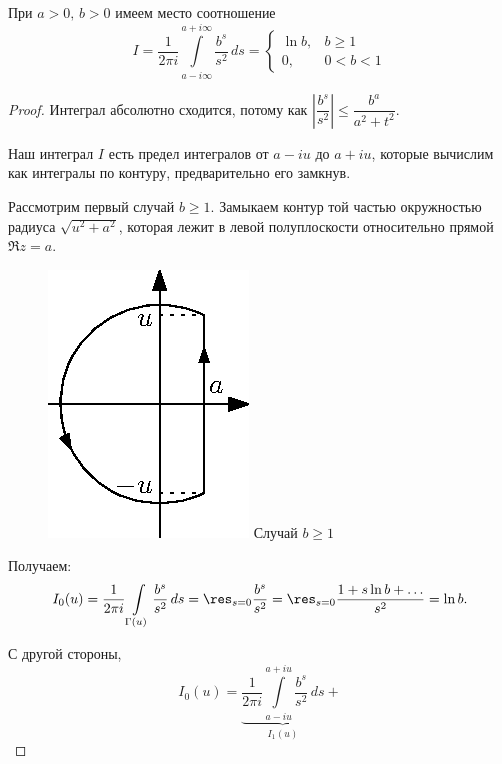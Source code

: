 \begin{lemma} При $a>0,\,b>0$ имеем место соотношение
$$I = \frac{1}{2\pi i}\int\limits_{a - i\infty}^{a + i\infty} \frac{b^s}{s^2}\,ds =
\begin{cases}
\ln b,&b \geqslant 1\\
0,&0<b<1
\end{cases}$$
\label{lemma_for_om_formula}
\end{lemma}
\begin{proof}
Интеграл абсолютно сходится, потому как  $\left|\dfrac{b^s}{s^2}\right| \leqslant \dfrac{b^a}{a^2 + t^2}$.


Наш интеграл $I$ есть предел интегралов от $a-iu$ до $a+iu$, которые вычислим как интегралы по контуру, предварительно его замкнув.\par
{} Рассмотрим первый случай $b\ge1$. Замыкаем контур той частью окружностью радиуса $\sqrt{u^2 + a^2}$, которая лежит в левой полуплоскости относительно прямой $\Re{z}=a$.\par
\begin{figure}
\begin{center}
\vskip -20pt
\includegraphics[scale=1.0]{pics/05012}
Случай $b\ge1$
\end{center}
\end{figure}\par
Получаем:
$$I_0(u)=\frac{1}{2\pi i}\int\limits_{\Gamma(u)} \frac{b^s}{s^2}\,ds = \res_{s = 0}\frac{b^s}{s^2} = \res_{s=0}\frac{1+s\ln b + \ldots}{s^2} = \ln{b}.$$\par
С другой стороны,
$$I_0(u) = \underbrace{\frac{1}{2\pi i}\int\limits_{a - iu}^{a + iu}\frac{b^s}{s^2}\,ds}_{I_1(u)} +
$$
\end{proof}

